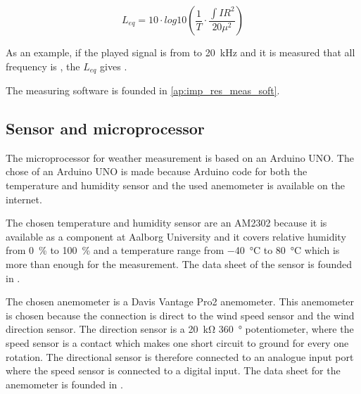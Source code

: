 \begin{equation}\label{topd:leq}
L_{eq} = 10 \cdot log10 \left ( \frac{1}{T} \cdot \frac{\int IR^2}{20\mu^2 } \right )
\end{equation}

\startexplain
{}
\stopexplain

As an example, if the played signal is from  to \SI{20}{\kilo\hertz} and it is measured that all frequency is , the $L_{eq}$ gives .

The measuring software is founded in  \autoref{ap:imp_res_meas_soft}.


\subsection{Sensor and microprocessor}\label{des:sensor_mic}
The microprocessor for weather measurement is based on an Arduino UNO. The chose of an Arduino UNO is made because Arduino code for both the temperature and humidity sensor and the used anemometer is available on the internet.  

The chosen temperature and humidity sensor are an AM2302 because it is available as a component at Aalborg University and it covers relative humidity from \SI{0}{\percent} to \SI{100}{\percent} and a temperature range from \SI{-40}{\celsius} to \SI{80}{\celsius} which is more than enough for the measurement. The data sheet of the sensor is founded in \citep{temp_sens}.


The chosen anemometer is a Davis Vantage Pro2 anemometer. This anemometer is chosen because the connection is direct to the wind speed sensor and the wind direction sensor. The direction sensor is a \SI{20}{\kilo\ohm} \SI{360}{\degree} potentiometer, where the speed sensor is a contact which makes one short circuit to ground for every one rotation. The directional sensor is therefore connected to an analogue input port where the speed sensor is connected to a digital input. The data sheet for the anemometer is founded in \citep{anemometer_sens}.



